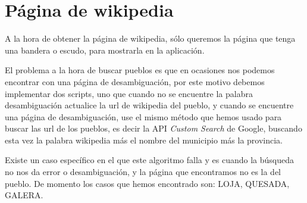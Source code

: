 \section{Página de wikipedia}

A la hora de obtener la página de wikipedia, sólo queremos la página que tenga una bandera o escudo, para mostrarla en la aplicación. 

El problema a la hora de buscar pueblos es que en ocasiones nos podemos encontrar con una página de desambiguación, por este motivo debemos implementar dos scripts, uno que cuando no se encuentre la palabra desambiguación actualice la url de wikipedia del pueblo, y cuando se encuentre una página de desambiguación, use el mismo método que hemos usado para buscar las url de los pueblos, es decir la API \textit{Custom Search} de Google, buscando esta vez la palabra wikipedia más el nombre del municipio más la provincia.

Existe un caso específico en el que  este algoritmo falla y es cuando la búsqueda no nos da error o desambiguación, y la página que encontramos no es la del pueblo. De momento los casos que hemos encontrado son: LOJA, QUESADA, GALERA.



%
